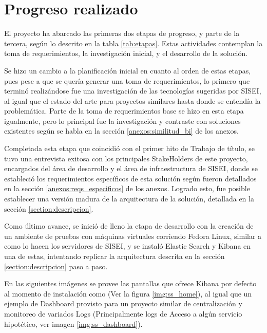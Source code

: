\section{Progreso realizado}


El proyecto ha abarcado las primeras dos etapas de progreso, y parte de la tercera, según lo descrito en la tabla \ref{tab:etapas}. Estas actividades contemplan la toma de requerimientos, la investigación inicial, y el desarrollo de la solución.

Se hizo un cambio a la planificación inicial en cuanto al orden de estas etapas, pues pese a que se quería generar una toma de requerimientos, lo primero que terminó realizándose fue una investigación de las tecnologías sugeridas por SISEI, al igual que el estado del arte para proyectos similares hasta donde se entendía la problemática. Parte de la toma de requerimientos base se hizo en esta etapa igualmente, pero lo principal fue la investigación y contraste con soluciones existentes según se habla en la sección \ref{anexos:similitud_bi} de los anexos.

Completada esta etapa que coincidió con el primer hito de Trabajo de título, se tuvo una entrevista exitosa con los principales StakeHolders de este proyecto, encargados del área de desarrollo y el área de infraestructura de SISEI, donde se estableció los requerimientos específicos de esta solución según fueron detallados en la sección \ref{anexos:reqs_especificos} de los anexos. Logrado esto, fue posible establecer una versión madura de la arquitectura de la solución, detallada en la sección \ref{section:descripcion}.

Como último avance, se inició de lleno la etapa de desarrollo con la creación de un ambiente de pruebas con máquinas virtuales corriendo Fedora Linux, similar a como lo hacen los servidores de SISEI, y se instaló Elastic Search y Kibana en una de estas, intentando replicar la arquitectura descrita en la sección \ref{section:descripcion} paso a paso.

En las siguientes imágenes se provee las pantallas que ofrece Kibana por defecto al momento de instalación como  (Ver la figura \ref{img:ss_home}), al igual que un ejemplo de Dashboard provisto para un proyecto similar de centralización y monitoreo de variados Logs (Principalmente logs de Acceso a algún servicio hipotético, ver imagen \ref{img:ss_dashboard}).



\clearpage
